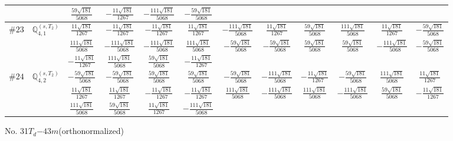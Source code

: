 \documentclass[fleqn,9pt,landscape]{jsarticle}
\begin{document}
\begin{center}
\begin{longtable}{lcccccccccc}
& $ \frac{59 \sqrt{181}}{5068} $ & $ - \frac{11 \sqrt{181}}{1267} $ & $ - \frac{111 \sqrt{181}}{5068} $ & $ - \frac{59 \sqrt{181}}{5068} $ & $  $ & $  $ & $  $ & $  $ & $  $ & $  $ \\ \hline
$ \#23\quad \mathbb{Q}_{4,1}^{(s,T_{2})} $ & $ \frac{11 \sqrt{181}}{1267} $ & $ - \frac{11 \sqrt{181}}{1267} $ & $ - \frac{11 \sqrt{181}}{1267} $ & $ \frac{11 \sqrt{181}}{1267} $ & $ - \frac{111 \sqrt{181}}{5068} $ & $ \frac{11 \sqrt{181}}{1267} $ & $ \frac{59 \sqrt{181}}{5068} $ & $ \frac{111 \sqrt{181}}{5068} $ & $ \frac{11 \sqrt{181}}{1267} $ & $ - \frac{59 \sqrt{181}}{5068} $ \\
& $ \frac{111 \sqrt{181}}{5068} $ & $ - \frac{111 \sqrt{181}}{5068} $ & $ - \frac{111 \sqrt{181}}{5068} $ & $ \frac{111 \sqrt{181}}{5068} $ & $ - \frac{59 \sqrt{181}}{5068} $ & $ - \frac{59 \sqrt{181}}{5068} $ & $ \frac{59 \sqrt{181}}{5068} $ & $ \frac{59 \sqrt{181}}{5068} $ & $ - \frac{111 \sqrt{181}}{5068} $ & $ - \frac{59 \sqrt{181}}{5068} $ \\
& $ - \frac{11 \sqrt{181}}{1267} $ & $ \frac{111 \sqrt{181}}{5068} $ & $ \frac{59 \sqrt{181}}{5068} $ & $ - \frac{11 \sqrt{181}}{1267} $ & $  $ & $  $ & $  $ & $  $ & $  $ & $  $ \\ \hline
$ \#24\quad \mathbb{Q}_{4,2}^{(s,T_{2})} $ & $ - \frac{59 \sqrt{181}}{5068} $ & $ - \frac{59 \sqrt{181}}{5068} $ & $ \frac{59 \sqrt{181}}{5068} $ & $ \frac{59 \sqrt{181}}{5068} $ & $ - \frac{59 \sqrt{181}}{5068} $ & $ - \frac{111 \sqrt{181}}{5068} $ & $ - \frac{11 \sqrt{181}}{1267} $ & $ - \frac{59 \sqrt{181}}{5068} $ & $ \frac{111 \sqrt{181}}{5068} $ & $ \frac{11 \sqrt{181}}{1267} $ \\
& $ \frac{11 \sqrt{181}}{1267} $ & $ \frac{11 \sqrt{181}}{1267} $ & $ - \frac{11 \sqrt{181}}{1267} $ & $ - \frac{11 \sqrt{181}}{1267} $ & $ \frac{111 \sqrt{181}}{5068} $ & $ - \frac{111 \sqrt{181}}{5068} $ & $ \frac{111 \sqrt{181}}{5068} $ & $ - \frac{111 \sqrt{181}}{5068} $ & $ \frac{59 \sqrt{181}}{5068} $ & $ - \frac{11 \sqrt{181}}{1267} $ \\
& $ \frac{111 \sqrt{181}}{5068} $ & $ \frac{59 \sqrt{181}}{5068} $ & $ \frac{11 \sqrt{181}}{1267} $ & $ - \frac{111 \sqrt{181}}{5068} $ & $  $ & $  $ & $  $ & $  $ & $  $ & $  $ \\
\end{longtable}
\end{center}
\newpage
\begin{center}
\LARGE
No. 31\quad$T_{d}$\quad$-43m$\quad[ cubic ] (orthonormalized)
\end{center}
\end{document}
